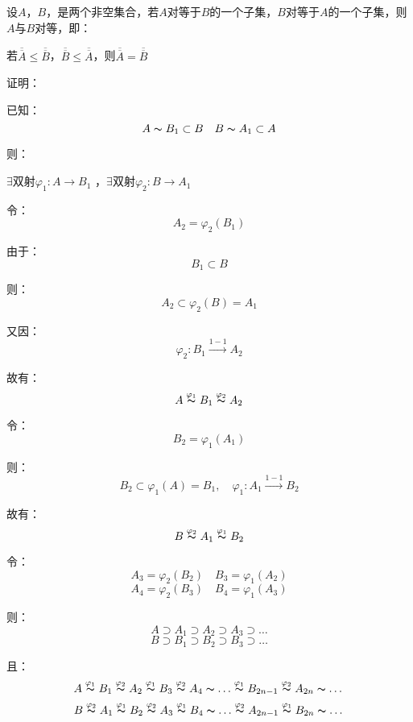 \begin{td}
设$A$，$B$，是两个非空集合，若$A$对等于$B$的一个子集，$B$对等于$A$的一个子集，则$A$与$B$对等，即：
\begin{center}
    若$\overline{\overline{A}} \leqslant \overline{\overline{B}}$，$\overline{\overline{B}} \leqslant \overline{\overline{A}}$，则$\overline{\overline{A}} = \overline{\overline{B}}$ 
\end{center}    
\end{td}
\noindent 证明：
\par 已知：
$$A \thicksim B_{1}\subset  B \quad B\thicksim A_{1} \subset  A $$
\par 则：
\begin{center}
$\exists$双射$\varphi _{1} : A \to B_{1}$ ，$\exists$双射$\varphi _{2} : B \to A_{1}$ 
\end{center}
\par 令：
$$A_{2} = \varphi _{2}(B_{1})$$ 
\par 由于：
$$B_{1}\subset B$$
\par 则：
$$A_{2}\subset \varphi _{2}(B) = A_{1}$$
\par 又因：
$$\varphi _{2}: B_{1}  \stackrel{1-1}{\to} A_{2}$$
\par 故有：
$$A \stackrel{\varphi _{1}}{\thicksim }B_{1}\stackrel{\varphi _{2}}{\thicksim }A_{2}$$
\par 令：
$$B_{2} = \varphi _{1}(A_{1})$$
\par 则：
$$B_{2}\subset \varphi _{1}(A) = B_{1},\quad \varphi _{1}: A_{1}  \stackrel{1-1}{\to} B_{2}$$
\par 故有：
$$B \stackrel{\varphi _{2}}{\thicksim }A_{1}\stackrel{\varphi _{1}}{\thicksim }B_{2}$$
\par 令：
$$A_{3} = \varphi _{2}(B_{2}) \quad B_{3} = \varphi _{1}(A_{2})$$
$$A_{4} = \varphi _{2}(B_{3}) \quad B_{4} = \varphi _{1}(A_{3})$$
\par 则：
$$A\supset A_{1}\supset A_{2}\supset A_{3}\supset \dots$$
$$B\supset B_{1}\supset B_{2}\supset B_{3}\supset \dots$$
\par 且：
$$A \stackrel{\varphi _{1}}{\thicksim }B_{1}\stackrel{\varphi _{2}}{\thicksim }A_{2}\stackrel{\varphi _{1}}{\thicksim }B_{3}\stackrel{\varphi _{2}}{\thicksim }A_{4}\thicksim \dots \stackrel{\varphi _{1}}{\thicksim }B_{2n-1}\stackrel{\varphi _{2}}{\thicksim }A_{2n} \thicksim \dots$$
$$B\stackrel{\varphi _{2}}{\thicksim }A_{1}\stackrel{\varphi _{1}}{\thicksim }B_{2}\stackrel{\varphi _{2}}{\thicksim }A_{3}\stackrel{\varphi _{1}}{\thicksim }B_{4}\thicksim \dots \stackrel{\varphi _{2}}{\thicksim }A_{2n-1}\stackrel{\varphi _{1}}{\thicksim }B_{2n} \thicksim \dots $$
